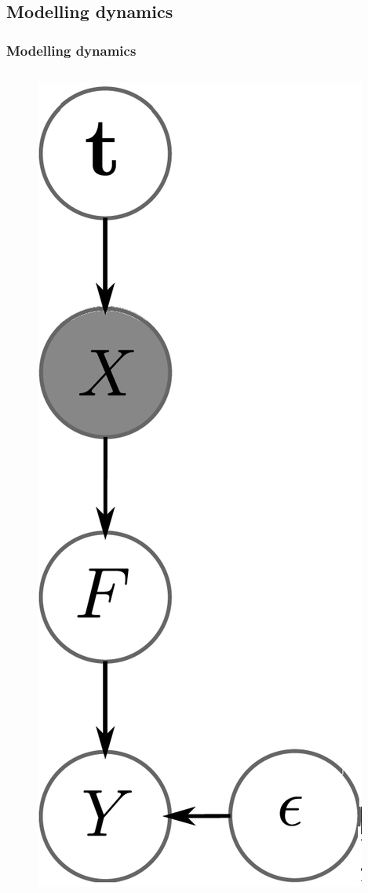 \documentclass{beamer}
\begin{document}
\subsection{Modelling dynamics}
\begin{frame}
	\frametitle{Modelling dynamics}
 \begin{columns}
      \begin{figure}
      \begin{center}
	  \includegraphics[width=1\textwidth]{bgplvm1b.png}
    \end{center}
    \end{figure}
 

\end{columns}
\end{frame}
\end{document}
